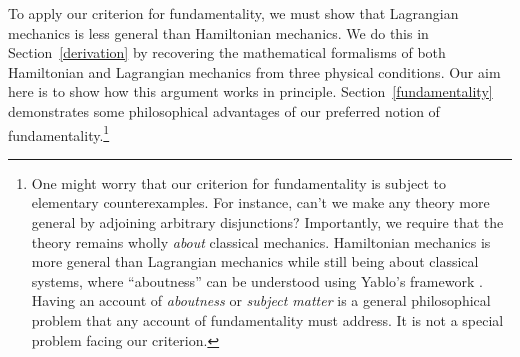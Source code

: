 \documentclass[12pt, twoside]{article}
\begin{document}
To apply our criterion for fundamentality, we must show that Lagrangian mechanics is less general than Hamiltonian mechanics. We do this in Section~\ref{derivation} by recovering the mathematical formalisms of both Hamiltonian and Lagrangian mechanics from three physical conditions. Our aim here is to show how this argument works in principle. Section~\ref{fundamentality} demonstrates some philosophical advantages of our preferred notion of fundamentality.\footnote{One might worry that our criterion for fundamentality is subject to elementary counterexamples. For instance, can't we make any theory more general by adjoining arbitrary disjunctions? Importantly, we require that the theory remains wholly \textit{about} classical mechanics. Hamiltonian mechanics is more general than Lagrangian mechanics while still being about classical systems, where ``aboutness'' can be understood using Yablo's framework \parencites*[]{Yablo}. Having an account of \textit{aboutness} or \textit{subject matter} is a general philosophical problem that any account of fundamentality must address. It is not a special problem facing our criterion.} 


\end{document}
